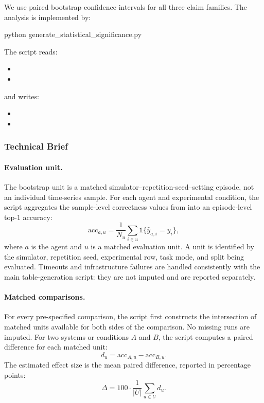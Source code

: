 \documentclass[11pt]{article}
\begin{document}
We use paired bootstrap confidence intervals for all three claim families.
The analysis is implemented by:
\begin{DocCode}
python generate_statistical_significance.py
\end{DocCode}
The script reads:
\begin{itemize}
  \item {}
  \item {}
\end{itemize}
and writes:
\begin{itemize}
  \item {}
  \item {}
\end{itemize}

\subsubsection{Technical Brief}
\paragraph{Evaluation unit.}
The bootstrap unit is a matched simulator--repetition-seed--setting episode, not an individual time-series sample.
For each agent and experimental condition, the script aggregates the sample-level correctness values from  into an episode-level top-1 accuracy:
\[
\mathrm{acc}_{a,u}
=
\frac{1}{N_u}
\sum_{i \in u}
\mathbb{1}\{\hat{y}_{a,i}=y_i\},
\]
where \(a\) is the agent and \(u\) is a matched evaluation unit.
A unit is identified by the simulator, repetition seed, experimental row, task mode, and split being evaluated.
Timeouts and infrastructure failures are handled consistently with the main table-generation script: they are not imputed and are reported separately.

\paragraph{Matched comparisons.}
For every pre-specified comparison, the script first constructs the intersection of matched units available for both sides of the comparison.
No missing runs are imputed.
For two systems or conditions \(A\) and \(B\), the script computes a paired difference for each matched unit:
\[
d_u = \mathrm{acc}_{A,u} - \mathrm{acc}_{B,u}.
\]
The estimated effect size is the mean paired difference, reported in percentage points:
\[
\Delta = 100 \cdot \frac{1}{|U|}\sum_{u \in U} d_u .
\]
\end{document}
